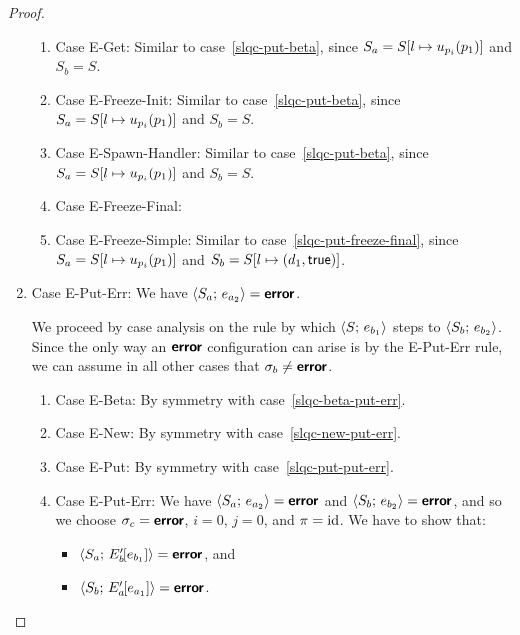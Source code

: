 \begin{proof}
\begin{enumerate}
\begin{enumerate}
    \item \label{slqc-put-get}Case {\sc E-Get}: Similar to
      case~\ref{slqc-put-beta}, since $S_a =
      S[l \mapsto u_{p_i}(p_1)]$ and $S_b = S$.
    \item \label{slqc-put-freeze-init}Case {\sc E-Freeze-Init}:
      Similar to case~\ref{slqc-put-beta}, since $S_a =
      S[l \mapsto u_{p_i}(p_1)]$ and $S_b = S$.
    \item \label{slqc-put-spawn-handler}Case {\sc E-Spawn-Handler}:
      Similar to case~\ref{slqc-put-beta}, since $S_a =
      S[l \mapsto u_{p_i}(p_1)]$ and $S_b = S$.
    \item \label{slqc-put-freeze-final}Case {\sc E-Freeze-Final}: \TODO{}
    \item \label{slqc-put-freeze-simple}Case {\sc E-Freeze-Simple}:
      Similar to case~\ref{slqc-put-freeze-final}, since $S_a =
      S[l \mapsto u_{p_i}(p_1)]$ and $S_b =
      S[l \mapsto (d_1, \textsf{true})]$.

    \end{enumerate}
  \item Case {\sc E-Put-Err}: We have $\langle S_a;\, e_{a_2} \rangle =
    \textbf{\textsf{error}}$.

    We proceed by case analysis on the rule by which
    $\langle S;\, e_{b_1} \rangle$ steps to $\langle S_b;\, e_{b_2} \rangle$.  Since the
    only way an $\textbf{\textsf{error}}$ configuration can arise is by the {\sc
      E-Put-Err} rule, we can assume in all other cases that $\sigma_b
    \neq \textbf{\textsf{error}}$.
    \begin{enumerate}
    \item \label{slqc-put-err-beta}Case {\sc E-Beta}: By symmetry with case~\ref{slqc-beta-put-err}.
    \item \label{slqc-put-err-new}Case {\sc E-New}: By symmetry with case~\ref{slqc-new-put-err}.
    \item \label{slqc-put-err-put}Case {\sc E-Put}: By symmetry with case~\ref{slqc-put-put-err}.
    \item \label{slqc-put-err-put-err}Case {\sc E-Put-Err}: We have
      $\langle S_a;\, e_{a_2} \rangle = \textbf{\textsf{error}}$ and $\langle S_b;\, e_{b_2} \rangle =
      \textbf{\textsf{error}}$, and so we choose $\sigma_c = \textbf{\textsf{error}}$, $i = 0$, $j = 0$,
      and $\pi = \mathrm{id}$.  We have to show that:
      \begin{itemize}
      \item $\langle S_a;\, E'_b\hspace{-1mm}\left[e_{b_1}\right] \rangle = \textbf{\textsf{error}}$, and
      \item
        $\langle S_b;\, E'_a\hspace{-1mm}\left[e_{a_1}\right] \rangle = \textbf{\textsf{error}}$.
      \end{itemize}


\end{enumerate}
\end{enumerate}
\end{proof}
